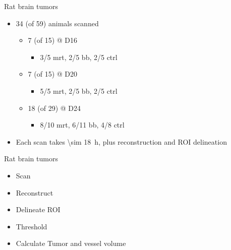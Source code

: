 \documentclass[caption=numbered]{beamer}
\begin{document}
\begin{frame}{Rat brain tumors}
	\begin{itemize}
		\item 34 (of 59) animals scanned 
		\begin{itemize}
			\item 7 (of 15) @ D16
			\begin{itemize}
				\item 3/5 mrt, 2/5 bb, 2/5 ctrl
			\end{itemize}
			\item 7 (of 15) @ D20
			\begin{itemize}
				\item 5/5 mrt, 2/5 bb, 2/5 ctrl
			\end{itemize}
			\item 18 (of 29) @ D24
			\begin{itemize}
				\item 8/10 mrt, 6/11 bb, 4/8 ctrl
			\end{itemize}
		\end{itemize}
	\item Each scan takes \SI{\sim 18}{\hour}, plus reconstruction and ROI delineation
	\end{itemize}
\end{frame}

\begin{frame}{Rat brain tumors}
	\begin{itemize}
		\item Scan
		\item Reconstruct
		\item Delineate ROI
		\item Threshold
		\item Calculate Tumor and vessel volume
	\end{itemize}
\end{frame}
\end{document}
